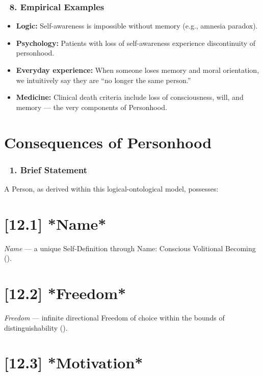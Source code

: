 \documentclass[12pt]{article}
\begin{document}
\subsubsection*{🔹 8. Empirical Examples}

\begin{itemize}
\item \textbf{Logic:} Self-awareness is impossible without memory (e.g., amnesia paradox).
\item \textbf{Psychology:} Patients with loss of self-awareness experience discontinuity of personhood.
\item \textbf{Everyday experience:} When someone loses memory and moral orientation, we intuitively say they are ``no longer the same person.''
\item \textbf{Medicine:} Clinical death criteria include loss of consciousness, will, and memory — the very components of Personhood.
\end{itemize}

\section*{Consequences of Personhood}

\subsubsection*{🔹 1. Brief Statement}

A Person, as derived within this logical-ontological model, possesses:

\section*{[12.1] *Name*}

\textit{Name} — a unique Self-Definition through Name: Conscious Volitional Becoming (\text{[12.1]}).

\section*{[12.2] *Freedom*}

\textit{Freedom} — infinite directional Freedom of choice within the bounds of distinguishability (\text{[12.2]}).

\section*{[12.3] *Motivation*}
\end{document}
